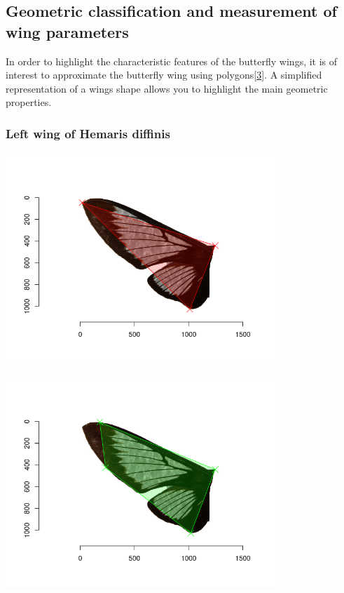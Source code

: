 \documentclass[
]{article}
\let\origfigure\figure
\let\endorigfigure\endfigure
\renewenvironment{figure}[1][2] {
    \expandafter\origfigure\expandafter[H]
} {
    \endorigfigure
}
\begin{document}
\hypertarget{geometric-classification-and-measurement-of-wing-parameters}{%
\subsection{Geometric classification and measurement of wing
parameters}\label{geometric-classification-and-measurement-of-wing-parameters}}

In order to highlight the characteristic features of the butterfly
wings, it is of interest to approximate the butterfly wing using
polygons{[}\protect\hyperlink{ref-Bronstein2008}{3}{]}. A simplified
representation of a wings shape allows you to highlight the main
geometric properties.

\hypertarget{left-wing-of-hemaris-diffinis}{%
\subsubsection{Left wing of Hemaris
diffinis}\label{left-wing-of-hemaris-diffinis}}

\begin{figure}
\centering
\includegraphics[width=\textwidth,height=3.125in]{./img/Areas_3_Hemaris_diffinis_left_wing.png}
\caption{Threangle}
\end{figure}

\begin{figure}
\centering
\includegraphics[width=\textwidth,height=3.125in]{./img/Areas_4_Hemaris_diffinis_left_wing.png}
\caption{Quadrangle}
\end{figure}
\end{document}
